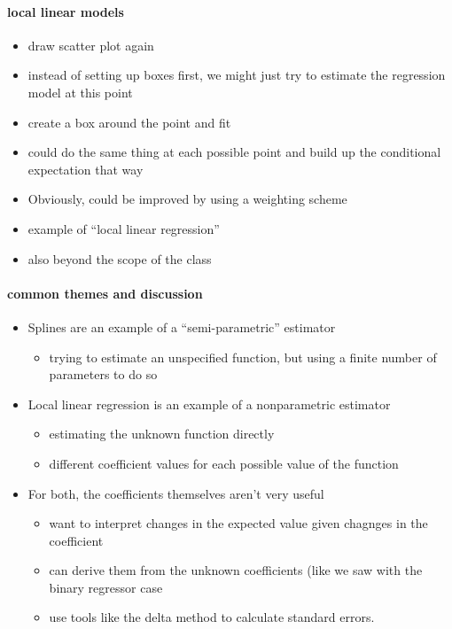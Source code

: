 \paragraph{local linear models}
\begin{itemize}
\item draw scatter plot again
\item instead of setting up boxes first, we might just try to
        estimate the regression model at this point
\item create a box around the point and fit
\item could do the same thing at each possible point and build up
        the conditional expectation that way
\item Obviously, could be improved by using a weighting scheme
\item example of ``local linear regression''
\item also beyond the scope of the class
\end{itemize}

\paragraph{common themes and discussion}
\begin{itemize}
\item Splines are an example of a ``semi-parametric'' estimator
\begin{itemize}
\item trying to estimate an unspecified function, but using a
          finite number of parameters to do so
\end{itemize}
\item Local linear regression is an example of a nonparametric estimator
\begin{itemize}
\item estimating the unknown function directly
\item different coefficient values for each possible value of the
          function
\end{itemize}
\item For both, the coefficients themselves aren't very useful
\begin{itemize}
\item want to interpret changes in the expected value given
          chagnges in the coefficient
\item can derive them from the unknown coefficients (like we saw
          with the binary regressor case
\item use tools like the delta method to calculate standard errors.
\end{itemize}
\end{itemize}

